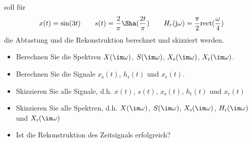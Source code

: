 soll für
\begin{align}
x(t)= \sin(3 t)\qquad
%
s(t) = \frac{2}{\pi} {\Sha}(\frac{2 t}{\pi})\qquad
%
H_r(\mathrm{j}\omega) = \frac{\pi}{2}\mathrm{rect}(\frac{\omega}{4})
\end{align}
die Abtastung und die Rekonstruktion berechnet und skizziert werden.

\begin{itemize}
  \item Berechnen Sie die Spektren $X(\im\omega)$, $S(\im\omega)$, $X_\mathrm{s}(\im\omega)$, $X_\mathrm{r}(\im\omega)$.
  \item Berechnen Sie die Signale $x_\mathrm{s}(t)$, $h_\mathrm{r}(t)$ und $x_\mathrm{r}(t)$.
  \item Skizzieren Sie alle Signale, d.h. $x(t)$, $s(t)$, $x_\mathrm{s}(t)$, $h_\mathrm{r}(t)$ und $x_\mathrm{r}(t)$
  \item Skizzieren Sie alle Spektren, d.h.  $X(\im\omega)$, $S(\im\omega)$, $X_\mathrm{s}(\im\omega)$, $H_\mathrm{r}(\im\omega)$ und $X_\mathrm{r}(\im\omega)$
  \item Ist die Rekonstruktion des Zeitsignals erfolgreich?
\end{itemize}






